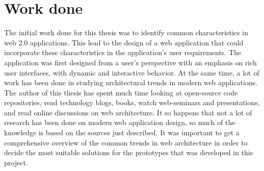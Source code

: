 
\section{Work done}
The initial work done for this thesis was to identify common characteristics in web 2.0 applications. This lead to the design of a web application that could incorporate these characteristics in the application's user requirements. The application was first designed from a user's perspective with an emphasis on rich user interfaces, with dynamic and interactive behavior. At the same time, a lot of work has been done in studying architectural trends in modern web applications. The author of this thesis has spent much time looking at open-source code repositories, read technology blogs, books, watch web-seminars and presentations, and read online discussions on web architecture. It so happens that not a lot of research has been done on modern web application design, so much of the knowledge is based on the sources just described. It was important to get a comprehensive overview of the common trends in web architecture in order to decide the most suitable solutions for the prototypes that was developed in this project.

